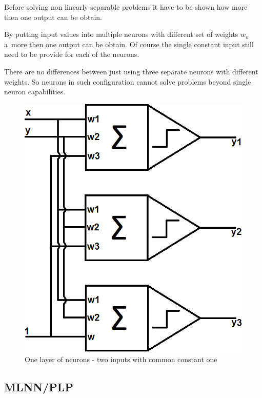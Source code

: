 Before solving non linearly separable problems it have to be shown how more then one output can be obtain.

By putting input values into multiple neurons with different set of weights $w_n$ a~more then one output can be obtain. Of course the single constant input still need to be provide for each of the neurons.

There are no differences between just using three separate neurons with different weights. So neurons in such configuration cannot solve problems beyond single neuron capabilities.

\begin{figure}[!h]
    \centering
    \includegraphics[scale=0.27]{Media/Layer.png}
    \caption[One layer of neurons]{One layer of neurons - two inputs with common constant one}
    \label{fig:OneNeuronsLayer}
\end{figure}

\newpage

\subsection{MLNN/PLP}


